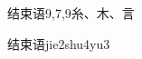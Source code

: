 \begin{entry}{结束语}{9,7,9}{⽷、⽊、⾔}
  \begin{phonetics}{结束语}{jie2shu4yu3}
  \end{phonetics}
\end{entry}
